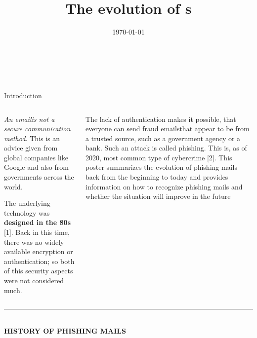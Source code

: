 \documentclass[compress,dvipsnames]{beamer}
\title{The evolution of \Phm s}
\author{}
\date{\today}
\newcommand{\mainRuleThickness}{4pt}
\newcommand{\blockTitleSize}{\huge}
\newcommand{\Em}{email} %
\newcommand{\Ems}{emails}
\newcommand{\ph}{phishing}
\newcommand{\phm}{phishing mail}
\begin{document}
\beamertemplatenavigationsymbolsempty

\phantom{X}
\begin{block}
    {\phantom{X}\\\centering \textbf{\Huge\inserttitle}\\\phantom{X}}
\end{block}


\begin{block}{\centering \blockTitleSize Introduction}
    \begin{columns}[T]
        \begin{column}{0.485\textwidth}
            \begin{minipage}[t][0.075\textheight][t]{\textwidth}
                \large
                \emph{An \Em\space is not a secure communication method.} This is an advice given from global companies like Google and also from governments across the world.

                The underlying technology was \textbf{designed in the 80s} [1]. Back in this time, there was no widely available encryption or authentication; so both of this security aspects were not considered much.
            \end{minipage}
        \end{column}

        \begin{column}{0.485\textwidth}
            \begin{minipage}[t][0.075\textheight][t]{\textwidth}
                \large
                The lack of authentication makes it possible, that everyone can send fraud \Ems\space that appear to be from a trusted source, such as a government agency or a bank. Such an attack is called \ph. This is, as of 2020, most common type of cybercrime [2]. This poster summarizes the evolution of \phm s back from the beginning to today and provides information on how to recognize \phm s and whether the situation will improve in the future
            \end{minipage}
        \end{column}
    \end{columns}
\end{block}

\vspace{-1.5cm}
\rule[0cm]{\textwidth}{\mainRuleThickness}
\phantom{X}\\
{\large \textbf{HISTORY OF PHISHING MAILS}}
\end{document}
